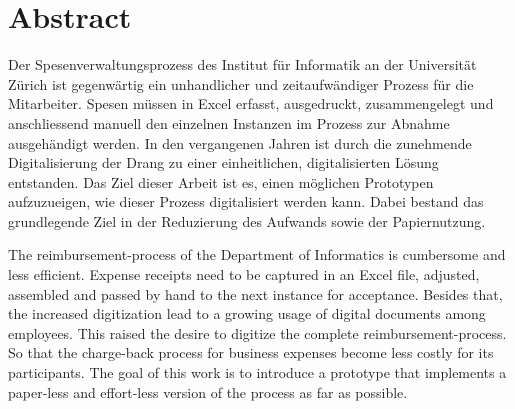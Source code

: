 \chapter*{Abstract}


Der Spesenverwaltungsprozess des Institut für Informatik an der Universität Zürich ist gegenwärtig ein unhandlicher und zeitaufwändiger Prozess für die Mitarbeiter. Spesen müssen in Excel erfasst, ausgedruckt, zusammengelegt und anschliessend manuell den einzelnen Instanzen im Prozess zur Abnahme ausgehändigt werden. In den vergangenen Jahren ist durch die zunehmende Digitalisierung der Drang zu einer einheitlichen, digitalisierten Lösung entstanden. Das Ziel dieser Arbeit ist es, einen möglichen Prototypen aufzuzueigen, wie dieser Prozess digitalisiert werden kann. Dabei bestand das grundlegende Ziel in der Reduzierung des Aufwands sowie der Papiernutzung. 


The reimbursement-process of the Department of Informatics is cumbersome and less efficient. Expense receipts need to be captured in an Excel file, adjusted, assembled and passed by hand to the next instance for acceptance. Besides that, the increased digitization lead to a growing usage of digital documents among employees. This raised the desire to digitize the complete reimbursement-process. So that the charge-back process for business expenses become less costly for its participants. The goal of this work is to introduce a prototype that implements a paper-less and effort-less version of the process as far as possible.
